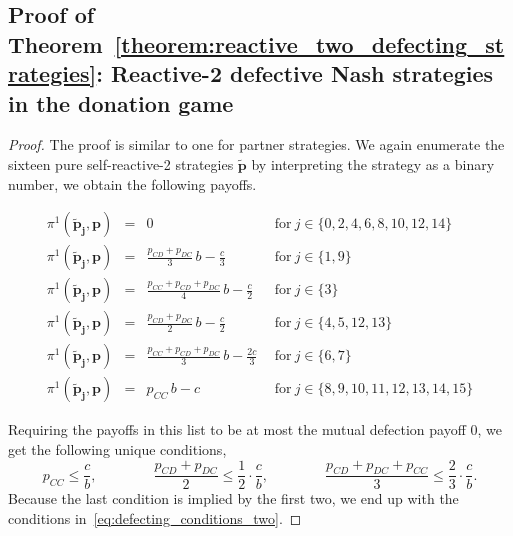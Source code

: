 \documentclass[11pt]{article}
\theoremstyle{plainCl1}
\theoremstyle{plainCl2}
\begin{document}
\subsection{Proof of Theorem~\ref{theorem:reactive_two_defecting_strategies}:
Reactive-2 defective Nash strategies in the donation game}
\begin{proof}
The proof is similar to one for partner strategies. We again enumerate the sixteen
pure self-reactive-2 strategies  $\mathbf{\tilde p}$  by interpreting the
strategy as a binary number, we obtain the following payoffs.

\begin{equation*}\label{Eq:PayoffExpressionsDefectiveReactiveTwo}
  \begin{array}{lcll}
   \pi^1(\mathbf{\tilde p_j},\mathbf{p}) &= &\displaystyle 0 & ~~\text{for}~ j\! \in\!  \{0, 2, 4, 6, 8, 10, 12, 14\} \\[0.3cm]
   \pi^1(\mathbf{\tilde p_j},\mathbf{p}) &= &\displaystyle  \frac{p_{CD} + p_{DC}}{3}\,b - \frac{c}{3}  & ~~\text{for}~ j\! \in\!  \{1, 9\} \\[0.3cm]
   \pi^1(\mathbf{\tilde p_j},\mathbf{p}) &= &\displaystyle  \frac{p_{CC} + p_{CD} + p_{DC}}{4}\,b - \frac{c}{2} & ~~\text{for}~ j\! \in\!  \{3\} \\[0.3cm]
   \pi^1(\mathbf{\tilde p_j},\mathbf{p}) &= &\displaystyle  \frac{p_{CD} + p_{DC}}{2}\,b - \frac{c}{2}  & ~~\text{for}~ j\! \in\!  \{4, 5, 12, 13\} \\[0.3cm]
   \pi^1(\mathbf{\tilde p_j},\mathbf{p}) &= &\displaystyle  \frac{p_{CC} + p_{CD} + p_{DC}}{3}\,b - \frac{2 c}{3}  & ~~\text{for}~ j\! \in\!  \{6, 7\}\\[0.3cm]
   \pi^1(\mathbf{\tilde p_j},\mathbf{p}) &= &\displaystyle  p_{CC}\,b - c & ~~\text{for}~ j\! \in\!  \{8, 9, 10, 11, 12, 13, 14, 15\}
  \end{array}
\end{equation*}

Requiring the payoffs in this list to be at most the mutual defection payoff $0$, we get the following unique conditions,
\begin{equation*}
  p_{CC}  \le \frac{c}{b}, \qquad \qquad
 \frac{p_{CD} + p_{DC}}{2}  \le \frac{1}{2} \cdot  \frac{c}{b}, \qquad \qquad
  \frac{p_{CD} + p_{DC} + p_{CC}}{3} \le	\frac{2}{3} \cdot \frac{c}{b}.
 \end{equation*}
Because the last condition is implied by the first two, we end up with the
conditions in~\eqref{eq:defecting_conditions_two}. 
\end{proof}
\end{document}
